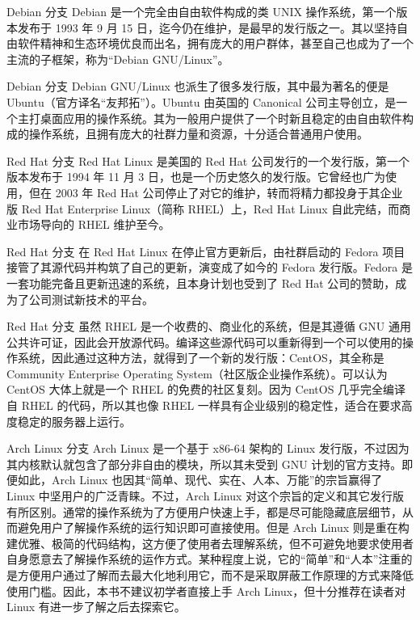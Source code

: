\documentclass[UTF8]{ctexbeamer}
\begin{document}
\begin{frame}{Debian 分支}
    Debian 是一个完全由自由软件构成的类 UNIX 操作系统，第一个版本发布于 1993 年 9 月 15 日，迄今仍在维护，是最早的发行版之一。其以坚持自由软件精神和生态环境优良而出名，拥有庞大的用户群体，甚至自己也成为了一个主流的子框架，称为“Debian GNU/Linux”。
\end{frame}
\begin{frame}{Debian 分支}
    Debian GNU/Linux 也派生了很多发行版，其中最为著名的便是 Ubuntu（官方译名“友邦拓”）。Ubuntu 由英国的 Canonical 公司主导创立，是一个主打桌面应用的操作系统。其为一般用户提供了一个时新且稳定的由自由软件构成的操作系统，且拥有庞大的社群力量和资源，十分适合普通用户使用。
\end{frame}
\begin{frame}{Red Hat 分支}
    Red Hat Linux 是美国的 Red Hat 公司发行的一个发行版，第一个版本发布于 1994 年 11 月 3 日，也是一个历史悠久的发行版。它曾经也广为使用，但在 2003 年 Red Hat 公司停止了对它的维护，转而将精力都投身于其企业版 Red Hat Enterprise Linux（简称 RHEL）上，Red Hat Linux 自此完结，而商业市场导向的 RHEL 维护至今。
\end{frame}
\begin{frame}{Red Hat 分支}
    在 Red Hat Linux 在停止官方更新后，由社群启动的 Fedora 项目接管了其源代码并构筑了自己的更新，演变成了如今的 Fedora 发行版。Fedora 是一套功能完备且更新迅速的系统，且本身计划也受到了 Red Hat 公司的赞助，成为了公司测试新技术的平台。
\end{frame}
\begin{frame}{Red Hat 分支}
    虽然 RHEL 是一个收费的、商业化的系统，但是其遵循 GNU 通用公共许可证，因此会开放源代码。编译这些源代码可以重新得到一个可以使用的操作系统，因此通过这种方法，就得到了一个新的发行版：CentOS，其全称是 Community Enterprise Operating System（社区版企业操作系统）。可以认为 CentOS 大体上就是一个 RHEL 的免费的社区复刻。因为 CentOS 几乎完全编译自 RHEL 的代码，所以其也像 RHEL 一样具有企业级别的稳定性，适合在要求高度稳定的服务器上运行。
\end{frame}
\begin{frame}{Arch Linux 分支}
    Arch Linux 是一个基于 x86-64 架构的 Linux 发行版，不过因为其内核默认就包含了部分非自由的模块，所以其未受到 GNU 计划的官方支持。即便如此，Arch Linux 也因其“简单、现代、实在、人本、万能”的宗旨赢得了 Linux 中坚用户的广泛青睐。不过，Arch Linux 对这个宗旨的定义和其它发行版有所区别。通常的操作系统为了方便用户快速上手，都是尽可能隐藏底层细节，从而避免用户了解操作系统的运行知识即可直接使用。但是 Arch Linux 则是重在构建优雅、极简的代码结构，这方便了使用者去理解系统，但不可避免地要求使用者自身愿意去了解操作系统的运作方式。某种程度上说，它的“简单”和“人本”注重的是方便用户通过了解而去最大化地利用它，而不是采取屏蔽工作原理的方式来降低使用门槛。因此，本书不建议初学者直接上手 Arch Linux，但十分推荐在读者对 Linux 有进一步了解之后去探索它。
\end{frame}
\end{document}
